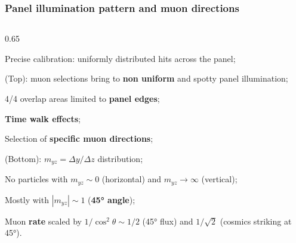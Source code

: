 \documentclass{beamer}
\begin{document}
\begin{frame}
    \frametitle{Panel illumination pattern and muon directions}
    \begin{columns}
\begin{column}{0.65\framewidth}
\vspace{-8mm}
   \setlength{\leftmargini}{1.2em}
      \begin{itemize}
 {\small
 \item Precise calibration: uniformly distributed hits across the panel;
 \vspace{1.6mm}
\item (Top): muon selections bring to \textbf{non uniform} and spotty panel illumination;
 \vspace{1.6mm}
\item 4/4 overlap areas limited to \textbf{panel edges};
 \vspace{1.6mm}
\item \textbf{Time walk effects};
 \vspace{1.6mm}
\item Selection of \textbf{specific
muon directions};
 \vspace{1.6mm}
\item (Bottom): $m_{yz}=\Delta y /\Delta z$ distribution;
 \vspace{1.6mm}
\item No particles with $m_{yz}\sim 0$ (horizontal) and $m_{yz} \rightarrow \infty$ (vertical);
 \vspace{1.6mm}
\item Mostly with $|m_{yz}| \sim 1$ (\textbf{45° angle});
 \vspace{1.6mm}
\item Muon \textbf{rate} scaled by $1/\cos^2\theta \sim 1/2$ (45° flux) and $1/\sqrt{2}$ (cosmics striking at 45°).}


\end{itemize}
\end{column}
\end{columns}
\end{frame}
\end{document}

